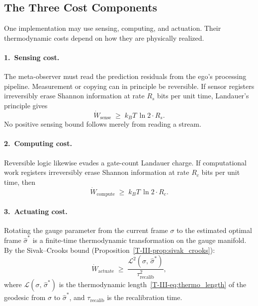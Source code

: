 \documentclass[12pt,a4paper,openany]{book}
\begin{document}
\subsection{The Three Cost Components}
\label{T-III-subsec:cost_components}

One implementation may use sensing, computing, and actuation.  Their
thermodynamic costs depend on how they are physically realized.

\paragraph{1.\ Sensing cost.}
The meta-observer must read the prediction residuals from
the ego's processing pipeline.
Measurement or copying can in principle be reversible.  If sensor
registers irreversibly erase Shannon information at rate $R_s$ bits per unit time,
Landauer's principle gives
\begin{equation}
\label{T-III-eq:W_sense}
\dot{W}_{\mathrm{sense}}
\;\geq\; k_BT\,\ln 2 \cdot R_s.
\end{equation}
No positive sensing bound follows merely from reading a stream.

\paragraph{2.\ Computing cost.}
Reversible logic likewise evades a gate-count Landauer charge.  If
computational work registers irreversibly erase Shannon information at rate $R_c$ bits
per unit time, then
\begin{equation}
\label{T-III-eq:W_compute}
\dot{W}_{\mathrm{compute}}
\;\geq\; k_BT\,\ln 2 \cdot R_c.
\end{equation}

\paragraph{3.\ Actuating cost.}
Rotating the gauge parameter from the current frame
$\sigma$ to the estimated optimal frame
$\hat{\sigma}^*$ is a finite-time thermodynamic
transformation on the gauge manifold.
By the Sivak--Crooks bound
(Proposition~\ref{T-III-prop:sivak_crooks}):
\begin{equation}
\label{T-III-eq:W_actuate}
\dot{W}_{\mathrm{actuate}}
\;\geq\; \frac{\mathcal{L}^2(\sigma,\,\hat{\sigma}^*)}
  {\tau_{\mathrm{recalib}}^2},
\end{equation}
where $\mathcal{L}(\sigma,\,\hat{\sigma}^*)$ is the
thermodynamic length~\eqref{T-III-eq:thermo_length} of the
geodesic from $\sigma$ to $\hat{\sigma}^*$, and
$\tau_{\mathrm{recalib}}$ is the recalibration time.
\end{document}

